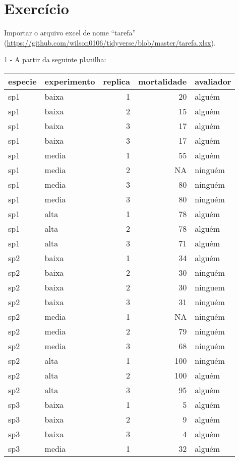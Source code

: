 \documentclass[]{book}
\begin{document}
\hypertarget{exercuxedcio}{%
\chapter{Exercício}\label{exercuxedcio}}

Importar o arquivo excel de nome ``tarefa'' (\url{https://github.com/wilson0106/tidyverse/blob/master/tarefa.xlsx}).

1 - A partir da seguinte planilha:

\begin{tabular}{l|l|r|r|l}
\hline
especie & experimento & replica & mortalidade & avaliador\\
\hline
sp1 & baixa & 1 & 20 & alguém\\
\hline
sp1 & baixa & 2 & 15 & alguém\\
\hline
sp1 & baixa & 3 & 17 & alguém\\
\hline
sp1 & baixa & 3 & 17 & alguém\\
\hline
sp1 & media & 1 & 55 & alguém\\
\hline
sp1 & media & 2 & NA & ninguém\\
\hline
sp1 & media & 3 & 80 & ninguém\\
\hline
sp1 & media & 3 & 80 & ninguém\\
\hline
sp1 & alta & 1 & 78 & alguém\\
\hline
sp1 & alta & 2 & 78 & alguém\\
\hline
sp1 & alta & 3 & 71 & alguém\\
\hline
sp2 & baixa & 1 & 34 & alguém\\
\hline
sp2 & baixa & 2 & 30 & ninguém\\
\hline
sp2 & baixa & 2 & 30 & ninguem\\
\hline
sp2 & baixa & 3 & 31 & ninguém\\
\hline
sp2 & media & 1 & NA & ninguém\\
\hline
sp2 & media & 2 & 79 & ninguém\\
\hline
sp2 & media & 3 & 68 & ninguém\\
\hline
sp2 & alta & 1 & 100 & ninguém\\
\hline
sp2 & alta & 2 & 100 & alguém\\
\hline
sp2 & alta & 3 & 95 & alguém\\
\hline
sp3 & baixa & 1 & 5 & alguém\\
\hline
sp3 & baixa & 2 & 9 & alguém\\
\hline
sp3 & baixa & 3 & 4 & alguém\\
\hline
sp3 & media & 1 & 32 & alguém\\

\end{tabular}
\end{document}
